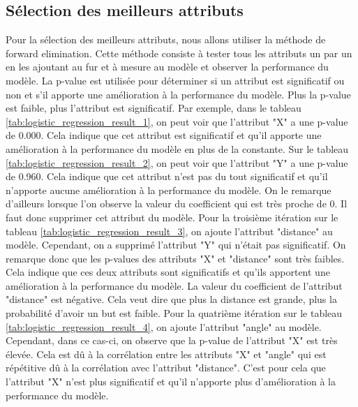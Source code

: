 \documentclass[12pt]{article}
\begin{document}
\subsection{Sélection des meilleurs attributs}
Pour la sélection des meilleurs attributs, nous allons utiliser la méthode de forward elimination.
Cette méthode consiste à tester tous les attributs un par un en les ajoutant au fur et à mesure au modèle et observer la performance du modèle.
La p-value est utilisée pour déterminer si un attribut est significatif ou non et s'il apporte une amélioration à la performance du modèle.
Plus la p-value est faible, plus l'attribut est significatif.
\newline\newline
Par exemple, dans le tableau \ref{tab:logistic_regression_result_1}, on peut voir que l'attribut "X" a une p-value de 0.000.
Cela indique que cet attribut est significatif et qu'il apporte une amélioration à la performance du modèle en plus de la constante.
\newline\newline
Sur le tableau \ref{tab:logistic_regression_result_2}, on peut voir que l'attribut "Y" a une p-value de 0.960.
Cela indique que cet attribut n'est pas du tout significatif et qu'il n'apporte aucune amélioration à la performance du modèle.
On le remarque d'ailleurs lorsque l'on observe la valeur du coefficient qui est très proche de 0.
Il faut donc supprimer cet attribut du modèle.
\newline\newline
Pour la troisième itération sur le tableau \ref{tab:logistic_regression_result_3}, on ajoute l'attribut "distance" au modèle.
Cependant, on a supprimé l'attribut "Y" qui n'était pas significatif.
On remarque donc que les p-values des attributs "X" et "distance" sont très faibles.
Cela indique que ces deux attributs sont significatifs et qu'ils apportent une amélioration à la performance du modèle.
La valeur du coefficient de l'attribut "distance" est négative. 
Cela veut dire que plus la distance est grande, plus la probabilité d'avoir un but est faible.
\newline\newline
Pour la quatrième itération sur le tableau \ref{tab:logistic_regression_result_4}, on ajoute l'attribut "angle" au modèle.
Cependant, dans ce cas-ci, on observe que la p-value de l'attribut "X" est très élevée. 
Cela est dû à la corrélation entre les attributs "X" et "angle" qui est répétitive dû à la corrélation avec l'attribut "distance".
C'est pour cela que l'attribut "X" n'est plus significatif et qu'il n'apporte plus d'amélioration à la performance du modèle.
\end{document}
